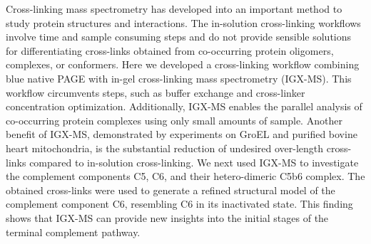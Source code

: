 \begin{abstract102}
	Cross-linking mass spectrometry has developed into an important method to study protein structures and interactions. The in-solution cross-linking workflows involve time and sample consuming steps and do not provide sensible solutions for differentiating cross-links obtained from co-occurring protein oligomers, complexes, or conformers. Here we developed a cross-linking workflow combining blue native PAGE with in-gel cross-linking mass spectrometry (IGX-MS). This workflow circumvents steps, such as buffer exchange and cross-linker concentration optimization. Additionally, IGX-MS enables the parallel analysis of co-occurring protein complexes using only small amounts of sample. Another benefit of IGX-MS, demonstrated by experiments on GroEL and purified bovine heart mitochondria, is the substantial reduction of undesired over-length cross-links compared to in-solution cross-linking. We next used IGX-MS to investigate the complement components C5, C6, and their hetero-dimeric C5b6 complex. The obtained cross-links were used to generate a refined structural model of the complement component C6, resembling C6 in its inactivated state. This finding shows that IGX-MS can provide new insights into the initial stages of the terminal complement pathway.
\end{abstract102}
%
